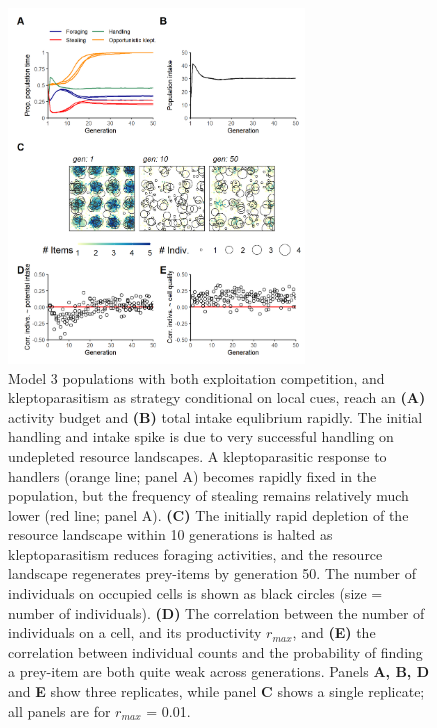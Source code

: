 \documentclass[11pt]{article}
\begin{document}
\begin{figure}[h!]
    \centering
    \includegraphics[width=0.70\textwidth]{figures/fig_04.png}
    \caption{
        Model 3 populations with both exploitation competition, and kleptoparasitism as strategy conditional on local cues, reach an \textbf{(A)} activity budget and \textbf{(B)} total intake equlibrium rapidly.
        The initial handling and intake spike is due to very successful handling on undepleted resource landscapes.
        A kleptoparasitic response to handlers (orange line; panel A) becomes rapidly fixed in the population, but the frequency of stealing remains relatively much lower (red line; panel A).
        \textbf{(C)} The initially rapid depletion of the resource landscape within 10 generations is halted as kleptoparasitism reduces foraging activities, and the resource landscape regenerates prey-items by generation 50.
        The number of individuals on occupied cells is shown as black circles (size = number of individuals).
        \textbf{(D)} The correlation between the number of individuals on a cell, and its productivity $r_{max}$, and
        \textbf{(E)} the correlation between individual counts and the probability of finding a prey-item are both quite weak across generations.
        Panels \textbf{A, B, D} and \textbf{E} show three replicates, while panel \textbf{C} shows a single replicate; all panels are for $r_{max}$ = 0.01.
    }
    \label{Fig:Model3}
\end{figure}
\end{document}
